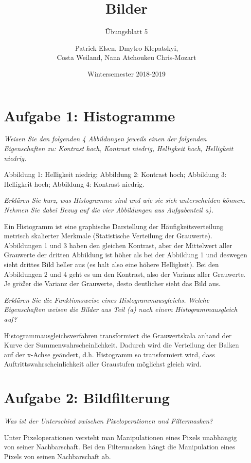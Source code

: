\documentclass[
  ngerman,
  DIV=14
]{scrartcl}
\title{Bilder}
\subtitle{Übungsblatt 5}
\author{Patrick Elsen, Dmytro Klepatskyi,\\Costa Weiland, Nana Atchoukeu Chris-Mozart}
\date{Wintersemester 2018-2019}
\begin{document}
\maketitle

\section*{Aufgabe 1: Histogramme}

\emph{Weisen Sie den folgenden 4 Abbildungen jeweils einen der folgenden Eigenschaften zu: Kontrast hoch, Kontrast niedrig, Helligkeit hoch, Helligkeit niedrig.}

Abbildung 1: Helligkeit niedrig; Abbildung 2: Kontrast hoch; Abbildung 3: Helligkeit hoch; Abbildung 4: Kontrast niedrig.

\emph{Erklären Sie kurz, was Histogramme sind und wie sie sich unterscheiden können. Nehmen Sie dabei Bezug auf die vier Abbildungen aus Aufgabenteil a).}

Ein Histogramm ist eine graphische Darstellung der Häufigkeitsverteilung metrisch skalierter Merkmale (Statistische Verteilung der Grauwerte). Abbildungen 1 und 3 haben den gleichen Kontrast, aber der Mittelwert aller Grauwerte der dritten Abbildung ist höher als bei der Abbildung 1 und deswegen sieht drittes Bild heller aus (es halt also eine höhere Helligkeit). Bei den Abbildungen 2 und 4 geht es um den Kontrast, also der Varianz aller Grauwerte. Je größer die Varianz der Grauwerte, desto deutlicher sieht das Bild aus.

\emph{Erklären Sie die Funktionsweise eines Histogrammausgleichs. Welche Eigenschaften weisen die Bilder aus Teil (a) nach einem Histogrammausgleich auf?}

Histogrammausgleichsverfahren transformiert die Grauwertskala anhand der Kurve der Summenwahrscheinlichkeit. Dadurch wird die Verteilung der Balken auf der x-Achse geändert, d.h. Histogramm so transformiert wird, dass Auftrittswahrscheinlichkeit aller Graustufen möglichst gleich wird. 

\section*{Aufgabe 2: Bildfilterung}

\emph{Was ist der Unterschied zwischen Pixeloperationen und Filtermasken?}

Unter Pixeloperationen versteht man Manipulationen eines Pixels unabhängig von seiner Nachbarschaft. Bei den Filtermasken hängt die Manipulation eines Pixels von seinen Nachbarschaft ab.
\end{document}
